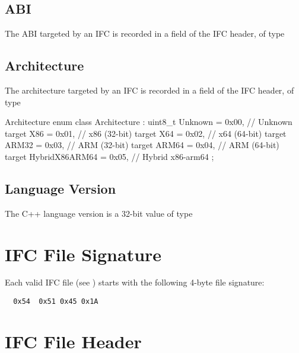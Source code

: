 \subsection{ABI}
\label{sec:ifc-abi-data-type}
The ABI targeted by an IFC is recorded in a field of the IFC header, of type 

\subsection{Architecture}
\label{sec:ifc-architecture-data-type}
The architecture targeted by an IFC is recorded in a field of the IFC header, of type
\begin{typedef}{Architecture}{}
	enum class Architecture : uint8_t {
		Unknown	= 0x00,		// Unknown target
		X86			= 0x01,		// x86 (32-bit) target
		X64			= 0x02,		// x64 (64-bit) target
		ARM32		= 0x03,		// ARM (32-bit) target
		ARM64		= 0x04,		// ARM (64-bit) target
		HybridX86ARM64 = 0x05,	// Hybrid x86-arm64
	};
\end{typedef}

\subsection{Language Version}
\label{sec:ifc-language-version}

The C++ language version is a 32-bit value of type 

\section{IFC File Signature}
\label{sec:ifc-file-signature}

Each valid IFC file (see ) starts with the following 4-byte file signature:
\begin{lstlisting}
  0x54  0x51 0x45 0x1A
\end{lstlisting}


\section{IFC File Header}
\label{sec:ifc-file-header}

